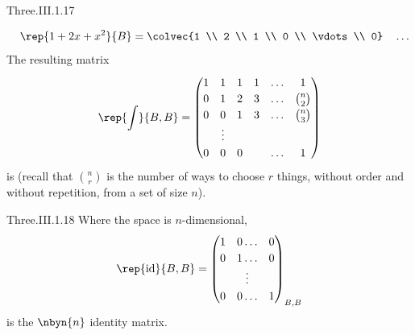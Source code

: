 \begin{ans}{Three.III.1.17}
\begin{exparts}
\begin{equation*}
            \quad
            \rep{1+2x+x^2}{B}=\colvec{1 \\ 2 \\ 1 \\ 0 \\ \vdots \\ 0}
            \quad\ldots
          \end{equation*}
          The resulting matrix
          \begin{equation*}
            \renewcommand{\arraystretch}{1.2}
            \rep{\int}{B,B}
            =\begin{pmatrix}
              1  &1   &1  &1  &\ldots  &1           \\
              0  &1   &2  &3  &\ldots  &\binom{n}{2}  \\
              0  &0   &1  &3  &\ldots  &\binom{n}{3}  \\
                 &\vdots                        \\
              0  &0   &0  &   &\ldots  &1
            \end{pmatrix}
          \end{equation*}
          is 
          (recall that $\binom{n}{r}$ is the number of ways to choose $r$
          things, without order and without repetition,
          from a set of size $n$).
      \end{exparts}
    
\end{ans}
\begin{ans}{Three.III.1.18}
      Where the space is \( n \)-dimensional,
      \begin{equation*}
        \rep{\text{id}}{B,B}=
        \begin{pmatrix}
          1  &0  \ldots  &0  \\
          0  &1  \ldots  &0  \\
             &\vdots         \\
          0  &0  \ldots  &1
        \end{pmatrix}_{B,B}
      \end{equation*}
      is the $\nbyn{n}$ identity matrix.
    
\end{ans}
